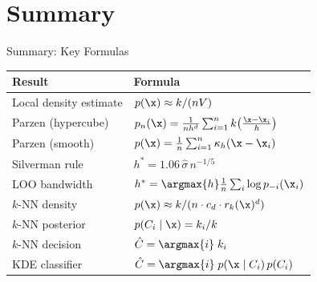 \section{Summary}

\begin{frame}{Summary: Key Formulas}
  \renewcommand{\arraystretch}{1.5}
  \begin{center}
  \begin{tabular}{ll}
    \toprule
    \textbf{Result} & \textbf{Formula} \\
    \midrule
    Local density estimate & $p(\x) \approx k/(nV)$ \\
    Parzen (hypercube) & $p_n(\x) = \frac{1}{nh^d}\sum_{i=1}^n k\!\left(\frac{\x-\x_i}{h}\right)$ \\
    Parzen (smooth) & $p(\x) = \frac{1}{n}\sum_{i=1}^n \kappa_h(\x - \x_i)$ \\
    Silverman rule & $h^* = 1.06\,\hat{\sigma}\,n^{-1/5}$ \\
    LOO bandwidth & $h^* = \argmax{h}\frac{1}{n}\sum_i \log p_{-i}(\x_i)$ \\
    $k$-NN density & $p(\x) \approx k/(n\cdot c_d\cdot r_k(\x)^d)$ \\
    $k$-NN posterior & $p(C_i \mid \x) = k_i/k$ \\
    $k$-NN decision & $\hat{C} = \argmax{i}\; k_i$ \\
    KDE classifier & $\hat{C} = \argmax{i}\; p(\x \mid C_i)\,p(C_i)$ \\
    \bottomrule
  \end{tabular}
  \end{center}
\end{frame}

